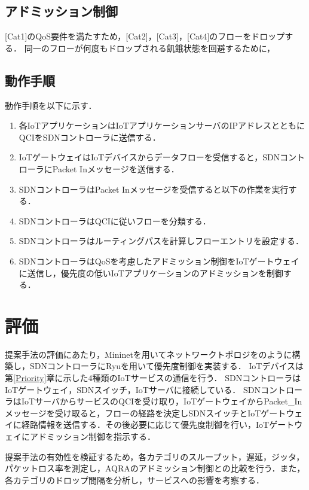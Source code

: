 \documentclass[a4paper,10pt,twocolumn,uplatex]{jsarticle}
\begin{document}
\subsection{アドミッション制御}
[Cat1]のQoS要件を満たすため，[Cat2]，[Cat3]，[Cat4]のフローをドロップする．
同一のフローが何度もドロップされる飢餓状態を回避するために，

\subsection{動作手順}
動作手順を以下に示す．

\begin{enumerate} %
  \item 各IoTアプリケーションはIoTアプリケーションサーバのIPアドレスとともにQCIをSDNコントローラに送信する．
  \item IoTゲートウェイはIoTデバイスからデータフローを受信すると，SDNコントローラにPacket Inメッセージを送信する．
  \item SDNコントローラはPacket Inメッセージを受信すると以下の作業を実行する．
  \item SDNコントローラはQCIに従いフローを分類する．
  \item SDNコントローラはルーティングパスを計算しフローエントリを設定する．
  \item SDNコントローラはQoSを考慮したアドミッション制御をIoTゲートウェイに送信し，優先度の低いIoTアプリケーションのアドミッションを制御する．
\end{enumerate}

\section{評価}
提案手法の評価にあたり，Mininetを用いてネットワークトポロジをのように構築し，SDNコントローラにRyuを用いて優先度制御を実装する．
IoTデバイスは第\ref{Priority}章に示した4種類のIoTサービスの通信を行う．
SDNコントローラはIoTゲートウェイ，SDNスイッチ，IoTサーバに接続している．
SDNコントローラはIoTサーバからサービスのQCIを受け取り，IoTゲートウェイからPacket\_Inメッセージを受け取ると，フローの経路を決定しSDNスイッチとIoTゲートウェイに経路情報を送信する．その後必要に応じて優先度制御を行い，IoTゲートウェイにアドミッション制御を指示する．\par
提案手法の有効性を検証するため，各カテゴリのスループット，遅延，ジッタ，パケットロス率を測定し，AQRAのアドミッション制御との比較を行う．また，各カテゴリのドロップ間隔を分析し，サービスへの影響を考察する．\par
\end{document}
